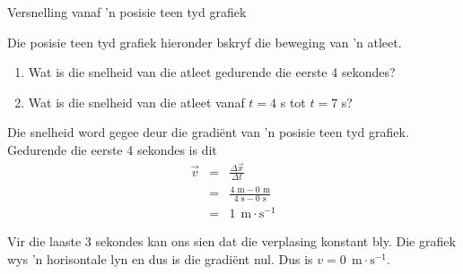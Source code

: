 \begin{wex}{Versnelling vanaf 'n posisie teen tyd grafiek}{Die posisie teen tyd grafiek hieronder bskryf die beweging van 'n atleet.\\
\begin{center}
\end{center}\begin{enumerate}[label=\textbf{\arabic*}.]
\item Wat is die snelheid van die atleet gedurende die eerste 4 sekondes?
\item Wat is die snelheid van die atleet vanaf $t=4$ s tot $t=7$ s?
\end{enumerate}}
{
Die snelheid word gegee deur die gradi\"ent van 'n posisie teen tyd grafiek. Gedurende die eerste 4 sekondes is dit
\begin{eqnarray*}
\vec{v}&=&\frac{\Delta \vec{x}}{\Delta t}\\
&=&\frac{4\text{~m} - 0\text{~m}}{4\text{~s} - 0\text{~s}}\\
&=&1\ ~\text{m}\cdot \text{s}^{-1}
\end{eqnarray*}

Vir die laaste 3 sekondes kan ons sien dat die verplasing konstant bly. Die grafiek wys 'n horisontale lyn en dus is die gradi\"ent nul. Dus is ${v}=0\ ~\text{m}\cdot \text{s}^{-1}$.}
\end{wex} 


